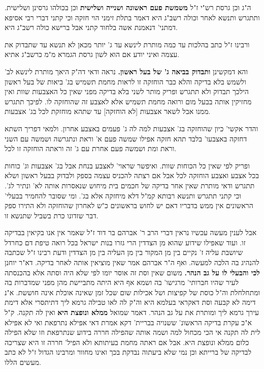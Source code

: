 \documentclass[12pt, openany]{book}
\newcommand{\sethebfont}{
\fontsize{10.5pt}{21.0pt} \selectfont
}
\newcommand{\twocol}[1]{
	{\sethebfont \begin{multicols}{2}
			#1
	\end{multicols}}	
}
\begin{document}
\twocol{ה"ג וכן גרסת רש"י ז"ל \textbf{משמשת פעם ראשונה ושנייה ושלישית}  וכן בכולהו גרסינן ושלישית. ותתגרש ותנשא לאחר וכולה רשב"ג היא דאמר בתלת זימני הוי חזקה וכי קתני דברי רבי אסיפא דמתני' דנאמנת אשה בלחוד קתני אבל ברישא כולה רשב"ג היא.\par  ורבינו ז"ל כתב בהלכות עד כמה מותרת לינשא עד ג' יותר מכאן לא תנשא עד שתבדוק את עצמה ואיני יודע אם הוא לשון גרסת הגמרא מ"מ כרשב"ג אתיא. 
\par והא דמקשינן \textbf{ותבדוק בביאה ג' של בעל ראשון.}  נראה ודאי דה"ק היאך מותרת לינשא לב' ולשמש בלא בדיקה והלא כבר הוחזקה זו לראות מחמת תשמיש בג' ביאות של בעל ראשון הילכך תבדוק ולא תתגרש ופריק מותר לשני בלא בדיקה מפני שאין כל האצבעות שוות ואין מחזיקין אותה בבעל מום ורואה מחמת תשמיש אלא לאצבע זה שהוחזקה לו. לפיכך תתגרש ממנו אבל לשאר אצבעות [לא הוחזקה] עד שתהא מוחזקת לכל בג' אצבעות.\par  והדר אקשי' כיון שהוחזקה בג' אצבעות למה לה ג' פעמים באצבע אחרון. ולמאי דפריך השתא דחזקה באצבעו' בלבד תהא חזקה אפילו שמשה פעם א' וראת ונתגרשה ושמשה עם השני וראת ומת ושמשה פעם אחרת עם ג' זה וראתה הוחזקה זו לכל.\par  ופריק לפי שאין כל הכוחות שוות. ואיפשר שראוי' לאצבע בנחת אבל בג' אצבעות וג' כוחות בכל אצבע ואצבע הוחזקה לכל אבל אם רצתה להכניס עצמה בספק ולבדוק בבעל ראשון ושלא תתגרש ודאי מותרת שאין אחר בדיקה של חכמים בית מיחוש שנאסרות אותה לא' ונתיר לג'. וכי קתני תתגרש ותנשא רבותא קמ"ל דלא מיחזקה אלא בג'. ומי שסובר להחמיר בבעלי' הראשונים אין ממש בדבריו דאם יש לחוש בראשונים כ"ש לאחרון שהוחזקה ולא התירו ספק דבר שזדונו כרת בשביל שתנשא זו.\par  אבל לענין מעשה עכשיו נראין דברי הרב ר' אברהם בר דוד ז"ל שאמר אין אנו בקיאין בבדיקה זו. ועוד שאפילו שידוע שהוא מן הצדדין הרי גזרו בנות ישראל בכל רואה טיפת דם כחרדל שיושבת עליה ז' נקיים בין מן המקור בין מן העליה בין מן הצדדין ודעת רבינו ז"ל שכתבה להנהיג בה הלכה למעשה. ואף ה"ר אברהם אמר שאין מוציאין אותה לאחר בדיקה. 
\parהא דא"ר יוחנן \textbf{לכי והבעלי לו על גב הנהר.}  משום שאין וסת זה אוסר יומו לפי שלא היה וסתה אלא בהכנסתה לעיר שהיו חברותי' מרגישו' בה ושמא אף היא היתה מתביישת מהן מפני שמדברות בה ומתחלחלת וה"ל כוסת של קפיצות ושל אכילות שום שכל זמן שאינה אוכלת אינה חוששת. א"נ דימה לא קבעה וסת דאקראי בעלמא היא וה"ק לה לאו טבילה גרמא ליך דתיתסרי אלא דימת עירך גרמא ליך ומותרת את על גב הנהר. 
\parהא דאמר שמואל \textbf{ממלא ונופצת היא}  ואין לה תקנה. ק"ל א"כ עקרת בדיקה הראשונ' ששנויה בבריית' דקא אמרת דאי אפילא נתרפאת ואי לא אפילא לית לה תקנה אי הכי מכחול למה ושמה אותה שהפילה חררה בידוע שנתרפאת וזו שלא הפילה כלום ממלא ונופצת היא. אבל אם ראתה מחמת בעיתותא ולא הפיל' חררה זו היא שצריכה לבדיקה של ברייתא וכן נמי שלא ביעתוה נבדקת בכך ואינו מחוור ומרבינו הגדול ז"ל לא כתב מעשים הללו. 
}
\end{document}
